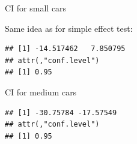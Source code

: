 \documentclass[ignorenonframetext,]{beamer}
\newenvironment{Shaded}{\begin{snugshade}}{\end{snugshade}}
\newcommand{\DataTypeTok}[1]{\textcolor[rgb]{0.13,0.29,0.53}{#1}}
\newcommand{\KeywordTok}[1]{\textcolor[rgb]{0.13,0.29,0.53}{\textbf{#1}}}
\newcommand{\NormalTok}[1]{#1}
\newcommand{\OperatorTok}[1]{\textcolor[rgb]{0.81,0.36,0.00}{\textbf{#1}}}
\newcommand{\StringTok}[1]{\textcolor[rgb]{0.31,0.60,0.02}{#1}}
\begin{document}
\begin{frame}[fragile]{CI for small cars}
\protect\hypertarget{ci-for-small-cars}{}

Same idea as for simple effect test:

\begin{Shaded}
\end{Shaded}

\begin{verbatim}
## [1] -14.517462   7.850795
## attr(,"conf.level")
## [1] 0.95
\end{verbatim}

\end{frame}

\begin{frame}[fragile]{CI for medium cars}
\protect\hypertarget{ci-for-medium-cars}{}

\begin{Shaded}
\end{Shaded}

\begin{verbatim}
## [1] -30.75784 -17.57549
## attr(,"conf.level")
## [1] 0.95
\end{verbatim}

\end{frame}
\end{document}
